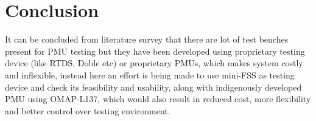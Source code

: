 \section{Conclusion}
It can be concluded from literature survey that there are lot of test benches present for PMU testing but they have been developed using  proprietary testing device (like RTDS, Doble etc) or  proprietary PMUs, which makes system costly and  inflexible, instead here an effort is being made to use mini-FSS as testing device and check its feasibility and usability, along with indigenously developed PMU using OMAP-L137,  which would also result in reduced cost, more flexibility and better control over testing environment.  